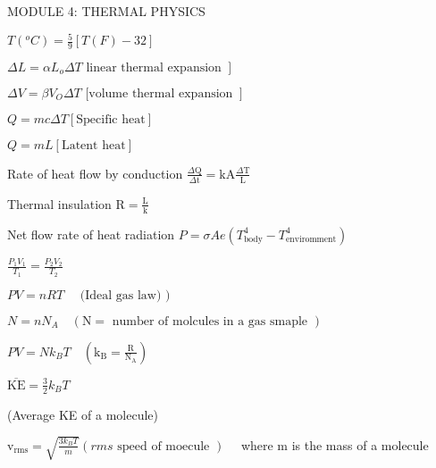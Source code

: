 \documentclass{extarticle}
\begin{document}
\begin{tcolorbox}[enhanced jigsaw,sharp corners,coltext=black,colback=BurntOrange!25!white,boxrule=pt,breakable,size=minimal]

MODULE 4: THERMAL PHYSICS

$T\left({ }^{o} C\right)=\frac{5}{9}[T(F)-32]$

$\left.\Delta L=\alpha L_{o} \Delta T \text { linear thermal expansion }\right]$

$\left.\Delta V=\beta V_{O} \Delta T \text { [volume thermal expansion }\right]$

$Q=m c \Delta T[\text {Specific heat}]$

$Q=m L[\text {Latent heat}]$

Rate of heat flow by conduction $\frac{\Delta \mathrm{Q}}{\Delta \mathrm{t}}=\mathrm{kA} \frac{\Delta \mathrm{T}}{\mathrm{L}}$

Thermal insulation $\mathrm{R}=\frac{\mathrm{L}}{\mathrm{k}}$

Net flow rate of heat radiation $P=\sigma A e\left(T_{\text {body}}^{4}-T_{\text {enviromment}}^{4}\right)$

$\frac{P_{1} V_{1}}{T_{1}}=\frac{P_{2} V_{2}}{T_{2}}$

$P V=n R T \quad \text { (Ideal gas law) })$

$N=n N_{A} \quad(\mathrm{N}=\text { number of molcules in a gas smaple })$

$P V=N k_{B} T \quad\left(\mathrm{k}_{\mathrm{B}}=\frac{\mathrm{R}}{\mathrm{N}_{\mathrm{A}}}\right)$

$\overline{\mathrm{KE}}=\frac{3}{2} k_{B} T$

(Average KE of a molecule)

$\mathrm{v}_{\mathrm{rms}}=\sqrt{\frac{3 k_{B} T}{m}}(r m s \text { speed of moecule }) \quad$ where $\mathrm{m}$ is the mass of a molecule


\end{tcolorbox}
\end{document}
